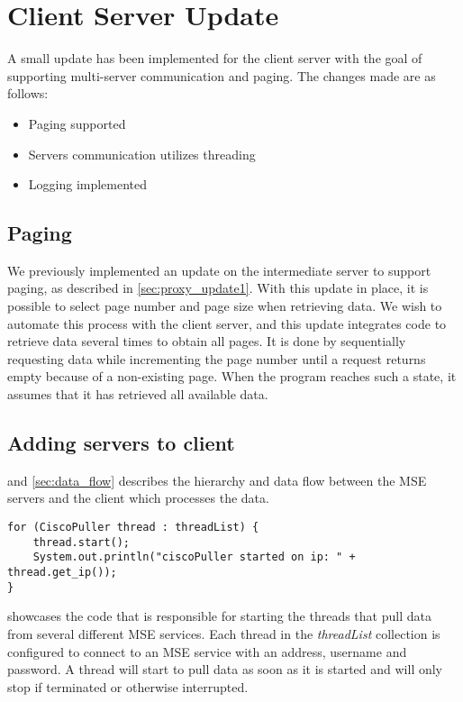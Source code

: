 \section{Client Server Update}
A small update has been implemented for the client server with the goal of supporting multi-server communication and paging. The changes made are as follows:

\begin{itemize}
\item Paging supported
\item Servers communication utilizes threading
\item Logging implemented
\end{itemize}

\subsection*{Paging}
We previously implemented an update on the intermediate server to support paging, as described in \cref{sec:proxy_update1}. With this update in place, it is possible to select page number and page size when retrieving data. We wish to automate this process with the client server, and this update integrates code to retrieve data several times to obtain all pages. It is done by sequentially requesting data while incrementing the page number until a request returns empty because of a non-existing page. When the program reaches such a state, it assumes that it has retrieved all available data.

\subsection*{Adding servers to client}
 and \cref{sec:data_flow} describes the hierarchy and data flow between the MSE servers and the client which processes the data. 
\begin{lstlisting}[caption={Starting threads to pull data from multiple MSE servers}, label={lst:cisco_puller}, language=inc_Java]
for (CiscoPuller thread : threadList) {
    thread.start();
    System.out.println("ciscoPuller started on ip: " + thread.get_ip());
}
\end{lstlisting}
 showcases the code that is responsible for starting the threads that pull data from several different MSE services. Each thread in the \textit{threadList} collection is configured to connect to an MSE service with an address, username and password. A thread will start to pull data as soon as it is started and will only stop if terminated or otherwise interrupted.

